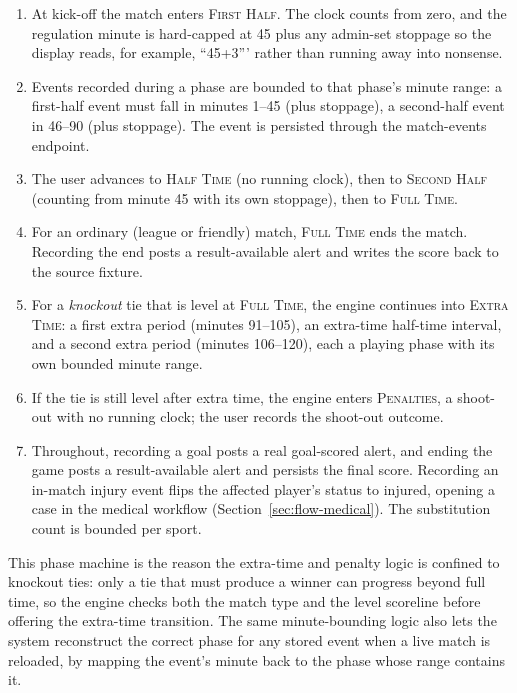 \begin{enumerate}
  \item At kick-off the match enters \textsc{First Half}. The clock counts from zero, and
  the regulation minute is hard-capped at 45 plus any admin-set stoppage so the display
  reads, for example, ``45+3''' rather than running away into nonsense.
  \item Events recorded during a phase are bounded to that phase's minute range: a
  first-half event must fall in minutes 1--45 (plus stoppage), a second-half event in
  46--90 (plus stoppage). The event is persisted through the match-events endpoint.
  \item The user advances to \textsc{Half Time} (no running clock), then to
  \textsc{Second Half} (counting from minute 45 with its own stoppage), then to
  \textsc{Full Time}.
  \item For an ordinary (league or friendly) match, \textsc{Full Time} ends the match.
  Recording the end posts a result-available alert and writes the score back to the
  source fixture.
  \item For a \emph{knockout} tie that is level at \textsc{Full Time}, the engine continues
  into \textsc{Extra Time}: a first extra period (minutes 91--105), an extra-time
  half-time interval, and a second extra period (minutes 106--120), each a playing phase
  with its own bounded minute range.
  \item If the tie is still level after extra time, the engine enters \textsc{Penalties}, a
  shoot-out with no running clock; the user records the shoot-out outcome.
  \item Throughout, recording a goal posts a real goal-scored alert, and ending the game
  posts a result-available alert and persists the final score. Recording an in-match injury
  event flips the affected player's status to injured, opening a case in the medical
  workflow (Section~\ref{sec:flow-medical}). The substitution count is bounded per sport.
\end{enumerate}

This phase machine is the reason the extra-time and penalty logic is confined to knockout
ties: only a tie that must produce a winner can progress beyond full time, so the engine
checks both the match type and the level scoreline before offering the extra-time
transition. The same minute-bounding logic also lets the system reconstruct the correct
phase for any stored event when a live match is reloaded, by mapping the event's minute
back to the phase whose range contains it.

